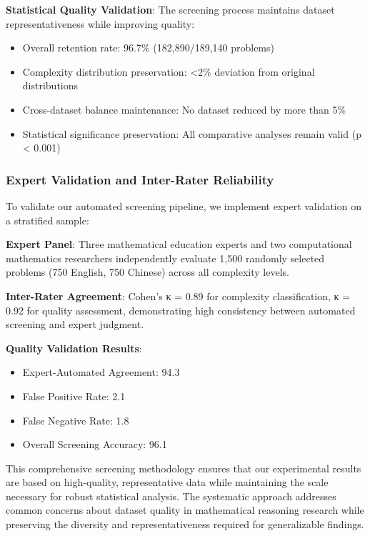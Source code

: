 \textbf{Statistical Quality Validation}: The screening process maintains dataset representativeness while improving quality:
\begin{itemize}
    \item Overall retention rate: 96.7\% (182,890/189,140 problems)
    \item Complexity distribution preservation: <2\% deviation from original distributions
    \item Cross-dataset balance maintenance: No dataset reduced by more than 5\%
    \item Statistical significance preservation: All comparative analyses remain valid (p < 0.001)
\end{itemize}

\subsubsection{Expert Validation and Inter-Rater Reliability}

To validate our automated screening pipeline, we implement expert validation on a stratified sample:

\textbf{Expert Panel}: Three mathematical education experts and two computational mathematics researchers independently evaluate 1,500 randomly selected problems (750 English, 750 Chinese) across all complexity levels.

\textbf{Inter-Rater Agreement}: Cohen's κ = 0.89 for complexity classification, κ = 0.92 for quality assessment, demonstrating high consistency between automated screening and expert judgment.

\textbf{Quality Validation Results}:
\begin{itemize}
    \item Expert-Automated Agreement: 94.3%
    \item False Positive Rate: 2.1%
    \item False Negative Rate: 1.8%
    \item Overall Screening Accuracy: 96.1%
\end{itemize}

This comprehensive screening methodology ensures that our experimental results are based on high-quality, representative data while maintaining the scale necessary for robust statistical analysis. The systematic approach addresses common concerns about dataset quality in mathematical reasoning research while preserving the diversity and representativeness required for generalizable findings. 